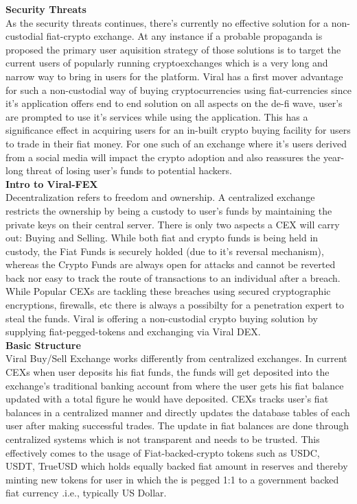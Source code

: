 \documentclass[10pt]{article}
\begin{document}
\textbf{Security Threats}\\

As the security threats continues, there's currently no effective solution for a non-custodial fiat-crypto exchange. At any instance if a probable propaganda is proposed the primary user aquisition strategy of those solutions is to target the current users of popularly running cryptoexchanges which is a very long and narrow way to bring in users for the platform. Viral has a first mover advantage for such a non-custodial way of buying cryptocurrencies using fiat-currencies since it's application offers end to end solution on all aspects on the de-fi wave, user's are prompted to use it's services while using the application. This has a significance effect in acquiring users for an in-built crypto buying facility for users to trade in their fiat money. For one such of an exchange where it's users derived from a social media will impact the crypto adoption and also reassures the year-long threat of losing user's funds to potential hackers.\\

\textbf{Intro to Viral-FEX}\\

Decentralization refers to freedom and ownership. A centralized exchange restricts the ownership by being a custody to user's funds by maintaining the private keys on their central server. There is only two aspects a CEX will carry out: Buying and Selling. While both fiat and crypto funds is being held in custody, the Fiat Funds is securely holded (due to it's reversal mechanism), whereas the Crypto Funds are always open for attacks and cannot be reverted back nor easy to track the route of transactions to an individual after a breach. While Popular CEXs are tackling these breaches using secured cryptographic encryptions, firewalls, etc there is always a possibilty for a penetration expert to steal the funds. Viral is offering a non-custodial crypto buying solution by supplying fiat-pegged-tokens and exchanging via Viral DEX.\\

\textbf{Basic Structure}\\

Viral Buy/Sell Exchange works differently from centralized exchanges. In current CEXs when user deposits his fiat funds, the funds will get deposited into the exchange's traditional banking account from where the user gets his fiat balance updated with a total figure he would have deposited. CEXs tracks user's fiat balances in a centralized manner and directly updates the database tables of each user after making successful trades. The update in fiat balances are done through centralized systems which is not transparent and needs to be trusted. This effectively comes to the usage of Fiat-backed-crypto tokens such as USDC, USDT, TrueUSD which holds equally backed fiat amount in reserves and thereby minting new tokens for user in which the is pegged 1:1 to a government backed fiat currency .i.e., typically US Dollar.\\
\end{document}
